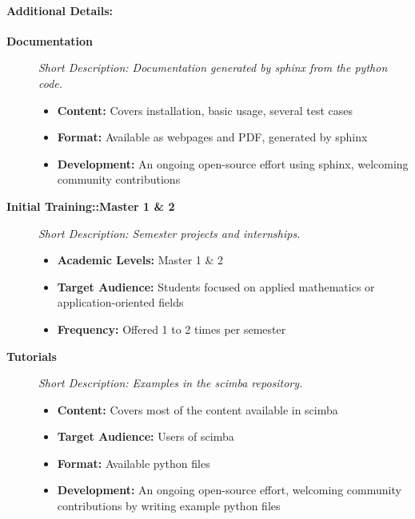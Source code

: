 \paragraph{Additional Details:}

\begin{description}

    \item[\textbf{Documentation}]
          \emph{Short Description: Documentation generated by sphinx from the python code.}

          \begin{itemize}
              \item \textbf{Content:} Covers installation, basic usage, several test cases
              \item \textbf{Format:} Available as webpages and PDF, generated by sphinx
              \item \textbf{Development:} An ongoing open-source effort using sphinx, welcoming community contributions
          \end{itemize}

    \item[\textbf{Initial Training::Master 1 \& 2}]
          \emph{Short Description: Semester projects and internships.}

          \begin{itemize}
              \item \textbf{Academic Levels:} Master 1 \& 2
              \item \textbf{Target Audience:} Students focused on applied mathematics or application-oriented fields
              \item \textbf{Frequency:} Offered 1 to 2 times per semester
          \end{itemize}

    \item[\textbf{Tutorials}]
          \emph{Short Description: Examples in the scimba repository.}

          \begin{itemize}
              \item \textbf{Content:} Covers most of the content available in scimba
              \item \textbf{Target Audience:} Users of scimba
              \item \textbf{Format:} Available python files
              \item \textbf{Development:} An ongoing open-source effort, welcoming community contributions by writing example python files
          \end{itemize}

\end{description}


